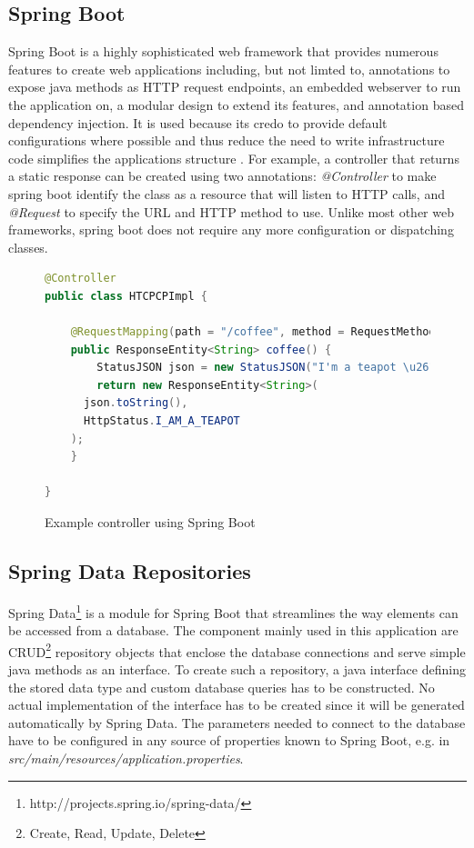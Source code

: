 \subsection{Spring Boot}
Spring Boot is a highly sophisticated web framework that provides numerous features to create web applications including, but not limted to, annotations to expose java methods as HTTP request endpoints, an embedded webserver to run the application on, a modular design to extend its features, and annotation based dependency injection. It is used because its credo to provide default configurations where possible and thus reduce the need to write infrastructure code simplifies the applications structure \cite[p. 6]{SpringGuide}.
For example, a controller that returns a static response can be created using two annotations:
\textit{@Controller} to make spring boot identify the class as a resource that will listen to HTTP calls, and \textit{@Request} to specify the URL and HTTP method to use. Unlike most other web frameworks, spring boot does not require any more configuration or dispatching classes.

\begin{figure}
\begin{lstlisting}[language=Java]
@Controller
public class HTCPCPImpl {

	@RequestMapping(path = "/coffee", method = RequestMethod.GET)
	public ResponseEntity<String> coffee() {
		StatusJSON json = new StatusJSON("I'm a teapot \u2615");
		return new ResponseEntity<String>(
      json.toString(),
      HttpStatus.I_AM_A_TEAPOT
    );
	}

}
\end{lstlisting}
\caption[Example Controller]{Example controller using Spring Boot}
\end{figure}

\subsection{Spring Data Repositories}
Spring Data\footnote{http://projects.spring.io/spring-data/} is a module for Spring Boot that streamlines the way elements can be accessed from a database.
The component mainly used in this application are CRUD\footnote{Create, Read, Update, Delete} repository objects that enclose the database connections and serve
simple java methods as an interface. To create such a repository, a java interface defining the stored data type and custom database queries has to be constructed.
No actual implementation of the interface has to be created since it will be generated automatically by Spring Data.
The parameters needed to connect to the database have to be configured in any source of properties known to Spring Boot, e.g. in \textit{src/main/resources/application.properties}.

